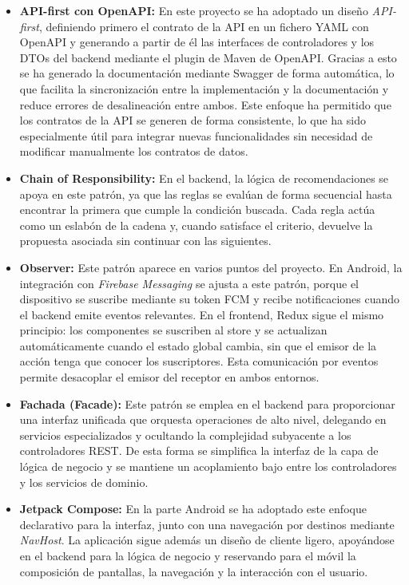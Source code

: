 \begin{itemize}

    \item \textbf{API-first con OpenAPI:} En este proyecto se ha adoptado un diseño \textit{API-first}, definiendo primero el contrato de la API en un fichero YAML con OpenAPI y generando a partir de él las interfaces de controladores y los DTOs del backend mediante el plugin de Maven de OpenAPI. Gracias a esto se ha generado la documentación mediante Swagger de forma automática, lo que facilita la sincronización entre la implementación y la documentación y reduce errores de desalineación entre ambos. Este enfoque ha permitido que los contratos de la API se generen de forma consistente, lo que ha sido especialmente útil para integrar nuevas funcionalidades sin necesidad de modificar manualmente los contratos de datos.

    \item \textbf{Chain of Responsibility:} En el backend, la lógica de recomendaciones se apoya en este patrón, ya que las reglas se evalúan de forma secuencial hasta encontrar la primera que cumple la condición buscada. Cada regla actúa como un eslabón de la cadena y, cuando satisface el criterio, devuelve la propuesta asociada sin continuar con las siguientes.

    \item \textbf{Observer:} Este patrón aparece en varios puntos del proyecto. En Android, la integración con \textit{Firebase Messaging} se ajusta a este patrón, porque el dispositivo se suscribe mediante su token FCM y recibe notificaciones cuando el backend emite eventos relevantes. En el frontend, Redux sigue el mismo principio: los componentes se suscriben al store y se actualizan automáticamente cuando el estado global cambia, sin que el emisor de la acción tenga que conocer los suscriptores. Esta comunicación por eventos permite desacoplar el emisor del receptor en ambos entornos.

    \item \textbf{Fachada (Facade):} Este patrón se emplea en el backend para proporcionar una interfaz unificada que orquesta operaciones de alto nivel, delegando en servicios especializados y ocultando la complejidad subyacente a los controladores REST. De esta forma se simplifica la interfaz de la capa de lógica de negocio y se mantiene un acoplamiento bajo entre los controladores y los servicios de dominio.

    \item \textbf{Jetpack Compose:} En la parte Android se ha adoptado este enfoque declarativo para la interfaz, junto con una navegación por destinos mediante \textit{NavHost}. La aplicación sigue además un diseño de cliente ligero, apoyándose en el backend para la lógica de negocio y reservando para el móvil la composición de pantallas, la navegación y la interacción con el usuario.

\end{itemize}

